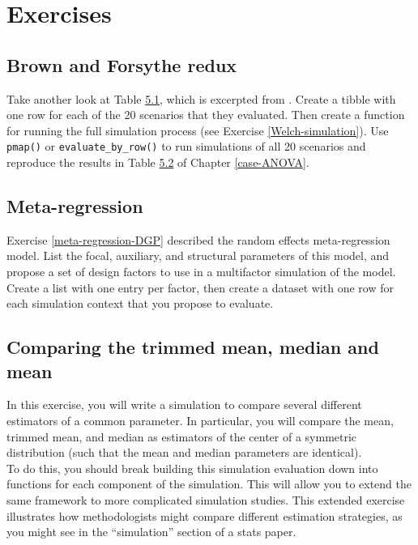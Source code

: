 \documentclass[
]{book}
\begin{document}
\section{Exercises}\label{exercises-7}

\subsection{Brown and Forsythe redux}\label{brown-and-forsythe-redux}

Take another look at Table \href{case-ANOVA.html\#tab:BF-Scenarios}{5.1}, which is excerpted from \citet{brown1974SmallSampleBehavior}.
Create a tibble with one row for each of the 20 scenarios that they evaluated.
Then create a function for running the full simulation process (see Exercise \ref{Welch-simulation}).
Use \texttt{pmap()} or \texttt{evaluate\_by\_row()} to run simulations of all 20 scenarios and reproduce the results in Table \href{case-ANOVA.html\#tab:BF-table1}{5.2} of Chapter \ref{case-ANOVA}.

\subsection{Meta-regression}\label{meta-regression}

Exercise \ref{meta-regression-DGP} described the random effects meta-regression model.
List the focal, auxiliary, and structural parameters of this model, and propose a set of design factors to use in a multifactor simulation of the model.
Create a list with one entry per factor, then create a dataset with one row for each simulation context that you propose to evaluate.

\subsection{Comparing the trimmed mean, median and mean}\label{exercise:trimmed-mean}

In this exercise, you will write a simulation to compare several different
estimators of a common parameter.
In particular, you will compare the mean, trimmed mean, and median as estimators of the center of a symmetric distribution (such that the mean and median parameters are identical).\\
To do this, you should break building this simulation evaluation down into functions for each component of the simulation.
This will allow you to extend the same framework to more complicated simulation studies.
This extended exercise illustrates how methodologists might compare different estimation strategies, as you might see in the ``simulation'' section of a stats paper.
\end{document}
